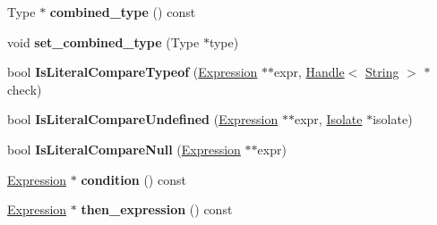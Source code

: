 \begin{DoxyCompactItemize}
\item 
\hypertarget{classv8_1_1internal_1_1_v8___f_i_n_a_l_aed1fb47e9dc8cff4fa15aed67002efa0}{}Type $\ast$ {\bfseries combined\+\_\+type} () const \label{classv8_1_1internal_1_1_v8___f_i_n_a_l_aed1fb47e9dc8cff4fa15aed67002efa0}

\item 
\hypertarget{classv8_1_1internal_1_1_v8___f_i_n_a_l_ae22d0ced8da4b5211c5fe95d7c729c30}{}void {\bfseries set\+\_\+combined\+\_\+type} (Type $\ast$type)\label{classv8_1_1internal_1_1_v8___f_i_n_a_l_ae22d0ced8da4b5211c5fe95d7c729c30}

\item 
\hypertarget{classv8_1_1internal_1_1_v8___f_i_n_a_l_a5fb1fa0468699963c237b9ead6ccce08}{}bool {\bfseries Is\+Literal\+Compare\+Typeof} (\hyperlink{classv8_1_1internal_1_1_expression}{Expression} $\ast$$\ast$expr, \hyperlink{classv8_1_1internal_1_1_handle}{Handle}$<$ \hyperlink{classv8_1_1internal_1_1_string}{String} $>$ $\ast$check)\label{classv8_1_1internal_1_1_v8___f_i_n_a_l_a5fb1fa0468699963c237b9ead6ccce08}

\item 
\hypertarget{classv8_1_1internal_1_1_v8___f_i_n_a_l_a9c0b0c252673188619a7ccfea6ddd673}{}bool {\bfseries Is\+Literal\+Compare\+Undefined} (\hyperlink{classv8_1_1internal_1_1_expression}{Expression} $\ast$$\ast$expr, \hyperlink{classv8_1_1internal_1_1_isolate}{Isolate} $\ast$isolate)\label{classv8_1_1internal_1_1_v8___f_i_n_a_l_a9c0b0c252673188619a7ccfea6ddd673}

\item 
\hypertarget{classv8_1_1internal_1_1_v8___f_i_n_a_l_ad323d020f310d1d8edea58129f1b572c}{}bool {\bfseries Is\+Literal\+Compare\+Null} (\hyperlink{classv8_1_1internal_1_1_expression}{Expression} $\ast$$\ast$expr)\label{classv8_1_1internal_1_1_v8___f_i_n_a_l_ad323d020f310d1d8edea58129f1b572c}

\item 
\hypertarget{classv8_1_1internal_1_1_v8___f_i_n_a_l_ad5acc76384238dc0da9f122856750f83}{}\hyperlink{classv8_1_1internal_1_1_expression}{Expression} $\ast$ {\bfseries condition} () const \label{classv8_1_1internal_1_1_v8___f_i_n_a_l_ad5acc76384238dc0da9f122856750f83}

\item 
\hypertarget{classv8_1_1internal_1_1_v8___f_i_n_a_l_a7222a31050414610905af105b25fa118}{}\hyperlink{classv8_1_1internal_1_1_expression}{Expression} $\ast$ {\bfseries then\+\_\+expression} () const \label{classv8_1_1internal_1_1_v8___f_i_n_a_l_a7222a31050414610905af105b25fa118}


\end{DoxyCompactItemize}
